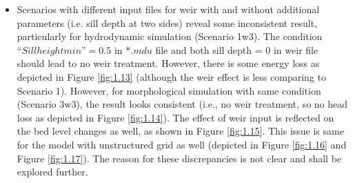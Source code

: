 \begin{itemize}
\item	Scenarios with different input files for weir with and without additional parameters (i.e. sill depth at two sides) reveal some inconsistent result, particularly for hydrodynamic simulation (Scenario 1w3). The condition $“Sillheightmin” = 0.5$ in $*.mdu$ file and both sill depth = 0 in weir file should lead to no weir treatment. However, there is some energy loss as depicted in Figure \ref{fig:1.13} (although the weir effect is less comparing to Scenario 1). However, for morphological simulation with same condition (Scenario 3w3), the result looks consistent (i.e., no weir treatment, so no head loss as depicted in Figure \ref{fig:1.14}). The effect of weir input is reflected on the bed level changes as well, as shown in Figure \ref{fig:1.15}. This issue is same for the model with unstructured grid as well (depicted in Figure \ref{fig:1.16} and Figure \ref{fig:1.17}). The reason for these discrepancies is not clear and shall be explored further.  

\end{itemize}


